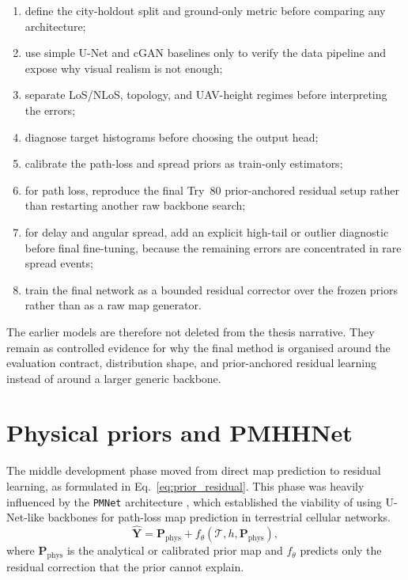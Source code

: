 \begin{enumerate}
\item define the city-holdout split and ground-only metric before comparing
      any architecture;
\item use simple U-Net and cGAN baselines only to verify the data pipeline and
      expose why visual realism is not enough;
\item separate LoS/NLoS, topology, and UAV-height regimes before interpreting
      the errors;
\item diagnose target histograms before choosing the output head;
\item calibrate the path-loss and spread priors as train-only estimators;
\item for path loss, reproduce the final Try~80 prior-anchored residual setup
      rather than restarting another raw backbone search;
\item for delay and angular spread, add an explicit high-tail or outlier
      diagnostic before final fine-tuning, because the remaining errors are
      concentrated in rare spread events;
\item train the final network as a bounded residual corrector over the frozen
      priors rather than as a raw map generator.
\end{enumerate}

The earlier models are therefore not deleted from the thesis narrative. They
remain as controlled evidence for why the final method is organised around the
evaluation contract, distribution shape, and prior-anchored residual learning
instead of around a larger generic backbone.

\section{Physical priors and PMHHNet}

The middle development phase moved from direct map prediction to residual learning, as
formulated in Eq.~\ref{eq:prior_residual}. This phase was heavily influenced by
the \texttt{PMNet} architecture \cite{pmnet2023}, which established the
viability of using U-Net-like backbones for path-loss map prediction in
terrestrial cellular networks.
\begin{equation}
  \hat{\textbf{Y}}
  =
  \textbf{P}_{\mathrm{phys}}
  +
  f_{\theta}\!\left(\mathcal{T}, h, \textbf{P}_{\mathrm{phys}}\right),
  \label{eq:prior_residual}
\end{equation}
where \(\textbf{P}_{\mathrm{phys}}\) is the analytical or calibrated prior map
and \(f_{\theta}\) predicts only the residual correction that the prior cannot
explain.


